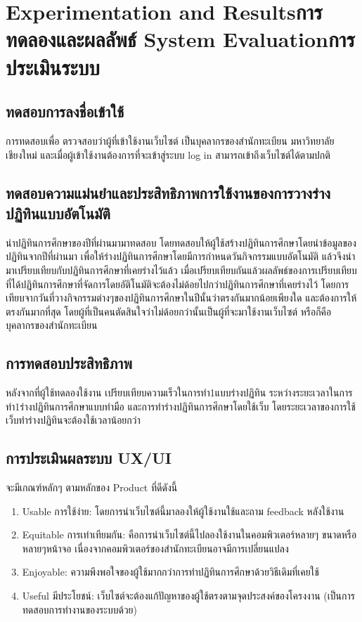\chapter{\ifproject%
\ifenglish Experimentation and Results\else การทดลองและผลลัพธ์\fi
\else%
\ifenglish System Evaluation\else การประเมินระบบ\fi
\fi}
\section{ทดสอบการลงชื่อเข้าใช้} 
   การทดสอบเพื่อ ตรวจสอบว่าผู้ที่เข้าใช้งานเว็บไซต์ เป็นบุคลากรของสำนักทะเบียน มหาวิทยาลัยเชียงใหม่ 
และเมื่อผู้เข้าใช้งานต้องการที่จะเข้าสู่ระบบ log in สามารถเข้าถึงเว็บไซต์ได้ตามปกติ

\section{ทดสอบความแม่นยำและประสิทธิภาพการใช้งานของการวางร่างปฏิทินแบบอัตโนมัติ}
   นำปฏิทินการศึกษาของปีที่ผ่านมามาทดสอบ โดยทดสอบให้ผู้ใช้สร้างปฏิทินการศึกษาโดยนำข้อมูลของปฏิทินจากปีที่ผ่านมา 
เพื่อให้ร่างปฏิทินการศึกษาโดยมีการกำหนดวันกิจกรรมแบบอัตโนมัติ แล้วจึงนำมาเปรียบเทียบกับปฏิทินการศึกษาที่เคยร่างไว้แล้ว 
เมื่อเปรียบเทียบกันแล้วผลลัพธ์ของการเปรียบเทียบที่ได้ปฏิทินการศึกษาที่จัดการโดยอัติโนมัติจะต้องไม่ด้อยไปกว่าปฏิทินการศึกษาที่เคยร่างไว้
โดยการเทียบจากวันที่วางกิจกรรมต่างๆของปฏิทินการศึกษาในปีนั้นว่าตรงกันมากน้อยเพียงใด และต้องการให้ตรงกันมากที่สุด
โดยผู้ที่เป็นคนตัดสินใจว่าไม่ด้อยกว่านั้นเป็นผู้ที่จะมาใช้งานเว็บไซต์ หรือก็คือบุคลากรของสำนักทะเบียน

\section{การทดสอบประสิทธิภาพ}
หลังจากที่ผู้ใช้ทดลองใช้งาน เปรียบเทียบความเร็วในการทำ1แบบร่างปฏิทิน ระหว่างระยะเวลาในการทำ1ร่างปฏิทินการศึกษาแบบทำมือ
และการทำร่างปฏิทินการศึกษาโดยใช้เว็บ โดยระยะเวลาของการใช้เว็บทำร่างปฏิทินจะต้องใช้เวลาน้อยกว่า

\section{การประเมินผลระบบ UX/UI } 
จะมีเกณฑ์หลักๆ ตามหลักของ Product ที่ดีดังนี้
\begin{enumerate}
   \item Usable การใช้ง่าย: โดยการนำเว็บไซต์นี้มาลองให้ผู้ใช้งานใช้และถาม feedback หลังใช้งาน
   \item Equitable การเท่าเทียมกัน: คือการนำเว็บไซต์นี้ไปลองใช้งานในคอมพิวเตอร์หลายๆ ขนาดหรือหลายๆหน้าจอ เนื่องจากคอมพิวเตอร์ของสำนักทะเบียนอาจมีการเปลี่ยนแปลง
   \item Enjoyable: ความพึงพอใจของผู้ใช้มากกว่าการทำปฏิทินการศึกษาด้วยวิธีเดิมที่เคยใช้
   \item Useful มีประโยชน์: เว็บไซต์จะต้องแก้ปัญหาของผู้ใช้ตรงตามจุดประสงค์ของโครงงาน (เป็นการทดสอบการทำงานของระบบด้วย)
\end{enumerate}
